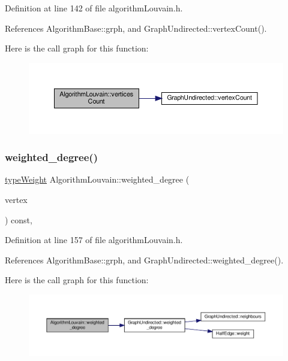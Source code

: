Definition at line 142 of file algorithm\+Louvain.\+h.



References Algorithm\+Base\+::grph, and Graph\+Undirected\+::vertex\+Count().

Here is the call graph for this function\+:
\nopagebreak
\begin{figure}[H]
\begin{center}
\leavevmode
\includegraphics[width=350pt]{classAlgorithmLouvain_ab132e4f38f353713dc8c0c89b3bde576_cgraph}
\end{center}
\end{figure}
\mbox{\label{classAlgorithmLouvain_a75a05ca235819217d3a91c1bd45def43}} 
\subsubsection{\texorpdfstring{weighted\+\_\+degree()}{weighted\_degree()}}
{\footnotesize\ttfamily \hyperlink{edge_8h_a2e7ea3be891ac8b52f749ec73fee6dd2}{type\+Weight} Algorithm\+Louvain\+::weighted\+\_\+degree (\begin{DoxyParamCaption}\item[{const \hyperlink{edge_8h_a5fbd20c46956d479cb10afc9855223f6}{type\+Vertex} \&}]{vertex }\end{DoxyParamCaption}) const\hspace{0.3cm}{\ttfamily [inline]}, {\ttfamily [private]}}



Definition at line 157 of file algorithm\+Louvain.\+h.



References Algorithm\+Base\+::grph, and Graph\+Undirected\+::weighted\+\_\+degree().

Here is the call graph for this function\+:
\nopagebreak
\begin{figure}[H]
\begin{center}
\leavevmode
\includegraphics[width=350pt]{classAlgorithmLouvain_a75a05ca235819217d3a91c1bd45def43_cgraph}
\end{center}
\end{figure}


